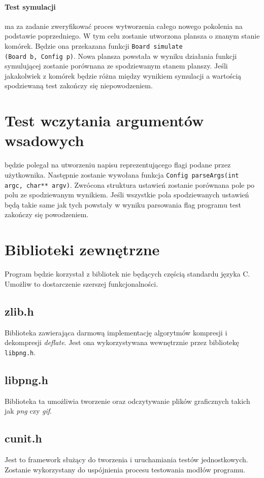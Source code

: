 \documentclass{article}
\begin{document}
\paragraph{Test symulacji} ma za zadanie zweryfikować proces wytworzenia całego nowego pokolenia na podstawie poprzedniego. W tym celu zostanie utworzona plansza o znanym stanie komórek. Będzie ona przekazana funkcji \texttt{Board simulate\\(Board b, Config p)}. Nowa plansza powstała w wyniku działania funkcji symulującej zostanie porównana ze spodziewanym stanem planszy. Jeśli jakakolwiek z komórek będzie różna między wynikiem symulacji a wartością spodziewaną test zakończy się niepowodzeniem.

\section{Test wczytania argumentów wsadowych} będzie polegał na utworzeniu napisu reprezentującego flagi podane przez użytkownika. Następnie zostanie wywołana funkcja \texttt{Config parseArgs(int argc, char** argv)}. Zwrócona struktura ustawień zostanie porównana pole po polu ze spodziewanym wynikiem. Jeśli wszystkie pola spodziewanych ustawień będą takie same jak tych powstały w wyniku parsowania flag programu test zakończy się powodzeniem.

\section{Biblioteki zewnętrzne}
Program będzie korzystał z bibliotek nie będących częścią standardu języka C. Umożliw to dostarczenie szerszej funkcjonalności.

\subsection{zlib.h}
Biblioteka zawierająca darmową implementację algorytmów kompresji i dekompresji \textit{deflate}. Jest ona wykorzystywana wewnętrznie przez bibliotekę \texttt{libpng.h}.

\subsection{libpng.h}
Biblioteka ta umożliwia tworzenie oraz odczytywanie plików graficznych takich jak \textit{png} czy \textit{gif}.

\subsection{cunit.h}
Jest to framework służący do tworzenia i uruchamiania testów jednostkowych. Zostanie wykorzystany do uspójnienia procesu testowania modłów programu.
\end{document}
